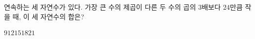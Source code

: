 연속하는 세 자연수가 있다. 가장 큰 수의 제곱이 다른 두 수의 곱의 $3$배보다 $24$만큼 작을 때, 이 세 자연수의 합은?
\begin{choices32}{$9$}{$12$}{$15$}{$18$}{$21$}\end{choices32}
